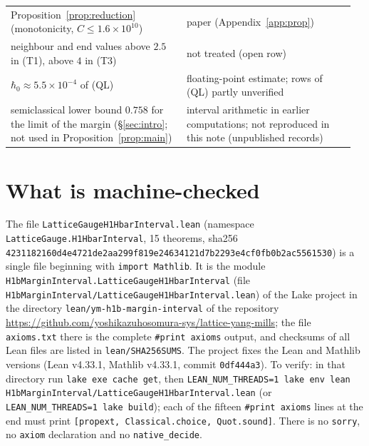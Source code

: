 \documentclass[11pt,a4paper]{article}
\theoremstyle{definition}
\theoremstyle{remark}
\begin{document}
\begin{table}[!htbp]
\begin{tabular}{@{}>{\raggedright\arraybackslash}p{0.49\linewidth}>{\raggedright\arraybackslash}p{0.47\linewidth}@{}}
Proposition~\ref{prop:reduction} (monotonicity, $C\le1.6\times10^{10}$) & paper (Appendix~\ref{app:prop})\\
neighbour and end values above $2.5$ in (T1), above $4$ in (T3) & not treated (open row)\\\midrule
$\hbar_0\approx5.5\times10^{-4}$ of (QL) & floating-point estimate; rows of (QL) partly unverified\\
semiclassical lower bound $0.758$ for the limit of the margin (\S\ref{sec:intro}; not used in Proposition~\ref{prop:main}) & interval arithmetic in earlier computations; not reproduced in this note (unpublished records)\\\bottomrule
\end{tabular}
\end{table}

\section{What is machine-checked}\label{sec:lean}

{\raggedright The file \texttt{LatticeGaugeH1HbarInterval.lean} (namespace \texttt{LatticeGauge.H1HbarInterval}, 15 theorems, sha256 \texttt{42311821\allowbreak{}60d4e472\allowbreak{}1de2aa29\allowbreak{}9f819e24\allowbreak{}634121d7\allowbreak{}b2293e4c\allowbreak{}f0fb0b2a\allowbreak{}c5561530}) is a single file beginning with \texttt{import Mathlib}. It is the module \texttt{H1bMarginInterval.\allowbreak{}LatticeGaugeH1HbarInterval} (file \texttt{H1bMarginInterval/\allowbreak{}LatticeGaugeH1HbarInterval.lean}) of the Lake project in the directory \texttt{lean/\allowbreak{}ym-h1b-margin-interval} of the repository \url{https://github.com/yoshikazuhosomura-sys/lattice-yang-mills}; the file \texttt{axioms.txt} there is the complete \texttt{\#print axioms} output, and checksums of all Lean files are listed in \texttt{lean/\allowbreak{}SHA256SUMS}. The project fixes the Lean and Mathlib versions (Lean v4.33.1, Mathlib v4.33.1, commit \texttt{0df444a3}). To verify: in that directory run \texttt{lake exe cache get}, then \texttt{LEAN\_NUM\_THREADS=1 lake env lean H1bMarginInterval/\allowbreak{}LatticeGaugeH1HbarInterval.lean} (or \texttt{LEAN\_NUM\_THREADS=1 lake build}); each of the fifteen \texttt{\#print axioms} lines at the end must print \texttt{[propext, Classical.choice, Quot.sound]}. There is no \texttt{sorry}, no \texttt{axiom} declaration and no \texttt{native\_decide}.\par}
\end{document}
